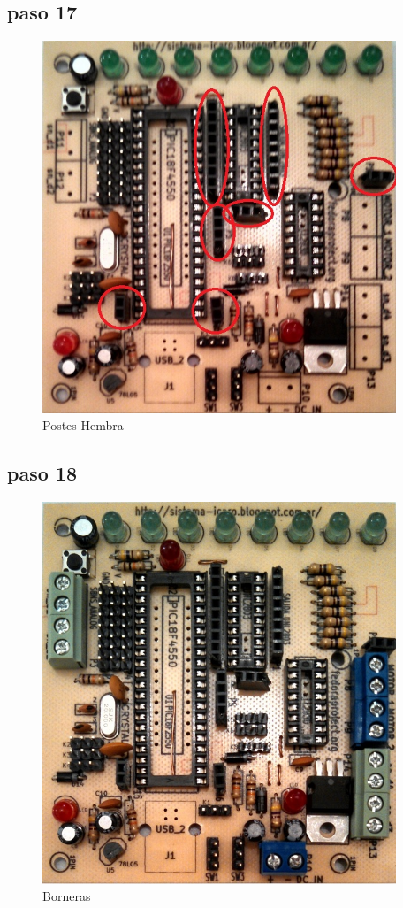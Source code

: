 \documentclass[letterpaper,10pt,english]{sphinxmanual}
\begin{document}
\subsection{paso 17}
\label{np07:paso-17}\begin{figure}[htbp]
\centering
\capstart

\includegraphics[width=300pt]{17b.jpg}
\caption{Postes Hembra}\end{figure}
\newpage

\subsection{paso 18}
\label{np07:paso-18}\begin{figure}[htbp]
\centering
\capstart

\includegraphics[width=300pt]{18b.jpg}
\caption{Borneras}\end{figure}
\newpage
\end{document}
